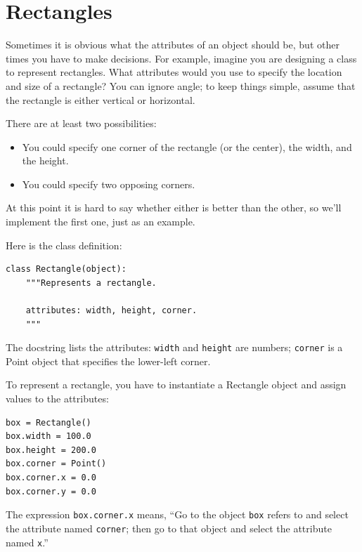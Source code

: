 \documentclass[10pt]{book}
\begin{document}
\begin{CJK}{UTF8}{gbsn}
\begin{exercise}
\end{exercise}



\section{Rectangles}
\label{rectangles}

Sometimes it is obvious what the attributes of an object should be,
but other times you have to make decisions.  For example, imagine you
are designing a class to represent rectangles.  What attributes would
you use to specify the location and size of a rectangle?  You can
ignore angle; to keep things simple, assume that the rectangle is
either vertical or horizontal.

There are at least two possibilities: 

\begin{itemize}

\item You could specify one corner of the rectangle
(or the center), the width, and the height.

\item You could specify two opposing corners.

\end{itemize}

At this point it is hard to say whether either is better than
the other, so we'll implement the first one, just as an example.

Here is the class definition:

\begin{verbatim}
class Rectangle(object):
    """Represents a rectangle. 

    attributes: width, height, corner.
    """
\end{verbatim}
%
The docstring lists the attributes:  {\tt width} and
{\tt height} are numbers; {\tt corner} is a Point object that
specifies the lower-left corner.

To represent a rectangle, you have to instantiate a Rectangle
object and assign values to the attributes:

\begin{verbatim}
box = Rectangle()
box.width = 100.0
box.height = 200.0
box.corner = Point()
box.corner.x = 0.0
box.corner.y = 0.0
\end{verbatim}
%
The expression {\tt box.corner.x} means,
``Go to the object {\tt box} refers to and select the attribute named
{\tt corner}; then go to that object and select the attribute named
{\tt x}.''


\end{CJK}
\end{document}
